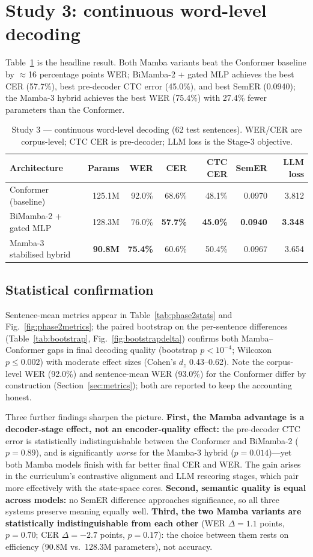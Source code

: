 \documentclass[11pt,a4paper]{report}
\begin{document}
\section{Study 3: continuous word-level decoding}
Table~\ref{tab:phase2} is the headline result. Both Mamba variants beat the
Conformer baseline by $\approx$16 percentage points WER; BiMamba-2 + gated
MLP achieves the best CER (57.7\%), best pre-decoder CTC error (45.0\%), and
best SemER (0.0940); the Mamba-3 hybrid achieves the best WER (75.4\%) with
27.4\% fewer parameters than the Conformer.

\begin{table}[htbp]
\centering
\caption{Study 3 --- continuous word-level decoding (62 test sentences).
WER/CER are corpus-level; CTC CER is pre-decoder; LLM loss is the Stage-3
objective.}
\label{tab:phase2}
\begin{tabular}{lrrrrrr}
\toprule
Architecture & Params & WER & CER & CTC CER & SemER & LLM loss \\
\midrule
Conformer (baseline) & 125.1M & 92.0\% & 68.6\% & 48.1\% & 0.0970 & 3.812 \\
BiMamba-2 + gated MLP & 128.3M & 76.0\% & \textbf{57.7\%} & \textbf{45.0\%} & \textbf{0.0940} & \textbf{3.348} \\
Mamba-3 stabilised hybrid & \textbf{90.8M} & \textbf{75.4\%} & 60.6\% & 50.4\% & 0.0967 & 3.654 \\
\bottomrule
\end{tabular}
\end{table}

\subsection{Statistical confirmation}
Sentence-mean metrics appear in Table~\ref{tab:phase2stats} and
Fig.~\ref{fig:phase2metrics}; the paired bootstrap on the per-sentence
differences (Table~\ref{tab:bootstrap}, Fig.~\ref{fig:bootstrapdelta})
confirms both Mamba--Conformer gaps in final decoding quality (bootstrap
$p<10^{-4}$; Wilcoxon $p\leq0.002$) with moderate effect sizes (Cohen's
$d_z$ 0.43--0.62). Note the corpus-level WER (92.0\%) and sentence-mean
WER (93.0\%) for the Conformer differ by construction
(Section~\ref{sec:metrics}); both are reported to keep the accounting
honest.

Three further findings sharpen the picture. \textbf{First, the Mamba
advantage is a decoder-stage effect, not an encoder-quality effect:} the
pre-decoder CTC error is statistically indistinguishable between the
Conformer and BiMamba-2 ($p=0.89$), and is significantly \emph{worse} for
the Mamba-3 hybrid ($p=0.014$)---yet both Mamba models finish with far
better final CER and WER. The gain arises in the curriculum's contrastive
alignment and LLM rescoring stages, which pair more effectively with the
state-space cores. \textbf{Second, semantic quality is equal across
models:} no SemER difference approaches significance, so all three systems
preserve meaning equally well. \textbf{Third, the two Mamba variants are
statistically indistinguishable from each other} (WER $\Delta=1.1$ points,
$p=0.70$; CER $\Delta=-2.7$ points, $p=0.17$): the choice between them
rests on efficiency (90.8M vs.\ 128.3M parameters), not accuracy.
\end{document}
